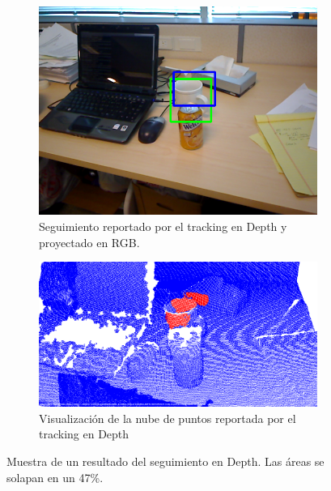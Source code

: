 \begin{figure}
	\centering
	\begin{subfigure}[b]{\textwidth}
		\includegraphics[width=\textwidth]{img/frame_98_taza_rgb.png}
		\caption{Seguimiento reportado por el tracking en Depth y proyectado en RGB.}
		\label{taza_ocluida_rgb}
	\end{subfigure}
	\quad
	\begin{subfigure}[b]{\textwidth}
		\includegraphics[width=\textwidth]{img/frame_98_taza_pcd.png}
		\caption{Visualización de la nube de puntos reportada por el tracking en Depth}
		\label{taza_ocluida_pcd}
	\end{subfigure}	
	\caption{Muestra de un resultado del seguimiento en Depth. Las áreas se solapan en un 47\%.}
	\label{taza_ocluida}
\end{figure}

